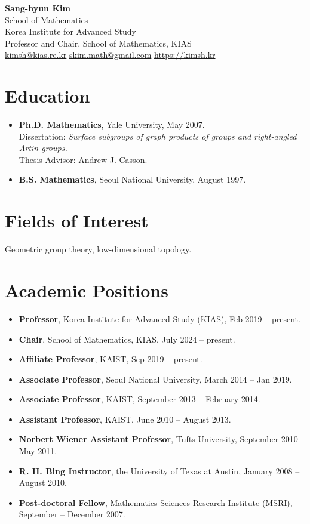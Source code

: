 \documentclass[11pt,a4paper]{article}
\begin{document}
\begin{center}
    {\Huge \textbf{Sang-hyun Kim}} \\ \vspace{0.3cm}
    School of Mathematics \\
    Korea Institute for Advanced Study \\
    Professor and Chair, School of Mathematics, KIAS \\
    \href{mailto:kimsh@kias.re.kr}{kimsh@kias.re.kr} \quad \href{mailto:skim.math@gmail.com}{skim.math@gmail.com} \quad \href{https://kimsh.kr}{https://kimsh.kr}
\end{center}

\vspace{0.5cm}

\section*{Education}
\begin{itemize}[leftmargin=1.5em]
    \item \textbf{Ph.D. Mathematics}, Yale University, May 2007. \\
    Dissertation: \textit{Surface subgroups of graph products of groups and right-angled Artin groups.} \\
    Thesis Advisor: Andrew J. Casson.
    \item \textbf{B.S. Mathematics}, Seoul National University, August 1997.
\end{itemize}

\section*{Fields of Interest}
Geometric group theory, low-dimensional topology.

\section*{Academic Positions}
\begin{itemize}[leftmargin=1.5em]
    \item \textbf{Professor}, Korea Institute for Advanced Study (KIAS), Feb 2019 -- present.
    \item \textbf{Chair}, School of Mathematics, KIAS, July 2024 -- present.
    \item \textbf{Affiliate Professor}, KAIST, Sep 2019 -- present.
    \item \textbf{Associate Professor}, Seoul National University, March 2014 -- Jan 2019.
    \item \textbf{Associate Professor}, KAIST, September 2013 -- February 2014.
    \item \textbf{Assistant Professor}, KAIST, June 2010 -- August 2013.
    \item \textbf{Norbert Wiener Assistant Professor}, Tufts University, September 2010 -- May 2011.
    \item \textbf{R. H. Bing Instructor}, the University of Texas at Austin, January 2008 -- August 2010.
    \item \textbf{Post-doctoral Fellow}, Mathematics Sciences Research Institute (MSRI), September -- December 2007.
\end{itemize}
\end{document}
